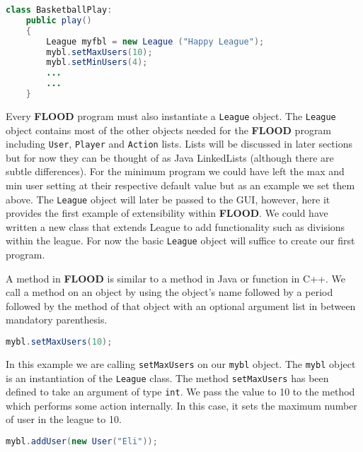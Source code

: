 \documentclass[12pt]{report}
\begin{document}
\begin{singlespace}
\begin{lstlisting}[language=Java,label=some-code,caption=BasketballPlay.fld]
class BasketballPlay:
	public play()
	{
		League myfbl = new League ("Happy League");
		mybl.setMaxUsers(10);
		mybl.setMinUsers(4);
		...
		...
	}
\end{lstlisting}
\end{singlespace}

Every \textbf{FLOOD} program must also instantiate a \texttt{League} object. The \texttt{League} object contains most of the other objects needed for the \textbf{FLOOD} program including \texttt{User}, \texttt{Player} and \texttt{Action} lists. Lists will be discussed in later sections but for now they can be thought of as Java LinkedLists (although there are subtle differences). For the minimum program we could have left the max and min user setting at their respective default value but as an example we set them above. The \texttt{League} object will later be passed to the GUI, however, here it provides the first example of extensibility within \textbf{FLOOD}. We could have written a new class that extends League to add functionality such as divisions within the league. For now the basic \texttt{League} object will suffice to create our first program.

A method in \textbf{FLOOD} is similar to a method in Java or function in C++. We call a method on an object by using the object's name followed by a period followed by the method of that object with an optional argument list in between mandatory parenthesis.

\begin{singlespace}
\begin{lstlisting}[language=Java,label=some-code,caption=Setting the maximum number of users]
mybl.setMaxUsers(10);
\end{lstlisting}
\end{singlespace}

In this example we are calling \texttt{setMaxUsers} on our \texttt{mybl} object. The \texttt{mybl} object is an instantiation of the \texttt{League} class. The method \texttt{setMaxUsers} has been defined to take an argument of type \texttt{int}. We pass the value to 10 to the method which performs some action internally. In this case, it sets the maximum number of user in the league to 10.

\begin{singlespace}
\begin{lstlisting}[language=Java,label=some-code,caption=Adding a new User]
mybl.addUser(new User("Eli"));
\end{lstlisting}
\end{singlespace}
\end{document}
